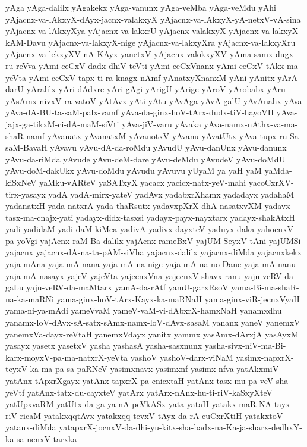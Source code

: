 {yAga
yAga-dalilx
yAgakekx
yAga-vanunx
yAga-veMba
yAga-veMdu
yAhi
yAjacnx-va-lAkxyX-dAyx-jacnx-valakxyX
yAjacnx-va-lAkxyX-yA-netxV-vA-sina
yAjacnx-va-lAkxyXya
yAjacnx-va-lakxrU
yAjacnx-valakxyX
yAjacnx-va-lakxyX-kAM-Davu
yAjacnx-va-lakxyX-nige
yAjacnx-va-lakxyXra
yAjacnx-va-lakxyXru
yAjacnx-va-lekxyXV-nA-KAyx-yanetxV
yAjacnx-valokxyXV
yAma-samx-dugx-ru-reVva
yAmi-ceCxV-dadx-dhiV-teVti
yAmi-ceCxVnanx
yAmi-ceCxV-tAkx-ma-yeVta
yAmi-ceCxV-tapx-ti-ra-knagx-nAmf
yAnatxyXnanxM
yAni
yAnitx
yArA-darU
yAralilx
yAri-dAdxre
yAri-gAgi
yArigU
yArige
yAroV
yArobabx
yAru
yAsAmx-nivxV-ra-vatoV
yAtAvx
yAti
yAtu
yAvAga
yAvA-galU
yAvAnahx
yAva
yAva-dA-BU-ta-saM-palx-vamf
yAva-da-ginx-hoV-tArx-dudx-tiV-hayoVH
yAva-jajx-ga-tikxM-ci-dA-maM-siVti
yAva-jiV-varu
yAvaka
yAva-namx-nAthx-va-ma-shaR-namf
yAvanatx
yAvanatxM
yAvanotxV
yAvanu
yAvatUtx
yAva-tupx-ru-Sa-saM-BavaH
yAvavu
yAvu-dA-da-roMdu
yAvudU
yAvu-danUnx
yAvu-danunx
yAvu-da-riMda
yAvude
yAvu-deM-dare
yAvu-deMdu
yAvudeV
yAvu-doMdU
yAvu-doM-dakUkx
yAvu-doMdu
yAvudu
yAvuvu
yUyaM
ya
yaH
yaM
yaMda-kiSxNeV
yaMku-vARteV
yaSATxyX
yacacx
yacicx-natx-yeV-mahi
yacoCxrXV-tirx-yasayx
yadA
yadA-mirx-yateV
yadAvx
yadabxrXhamx
yadadayx
yadahaM
yadanatxH
yada-natxrA
yada-thaRsutx
yadavxpXrX-dhA-nasatxvXM
yadavx-tasx-ma-cnajx-yati
yadayx-didx-tasxsi
yadayx-payx-nayxtarx
yadayx-shakAtxH
yadi
yadidaM
yadi-daM-kiMca
yadivA
yadivx-dayxteV
yaduyx-daka
yahocnxV-pa-yoVgi
yajAcnx-raM-Ba-dalilx
yajAcnx-rameBxV
yajUM-SeyxV-tAni
yajUMSi
yajacnx
yajacnx-dA-na-ta-pAM-siVha
yajacnx-dalilx
yajacnx-diMda
yajacnxkekx
yaja-mAna
yaja-mA-nana
yaja-mA-na-nige
yaja-mA-na-no-Dane
yaja-mA-nanu
yaja-mA-nasayx
yajeV
yajeVta
yajecnxVna
yajecnxV-shavx-ranu
yaju-veRV-da-gaLu
yaju-veRV-da-maMtarx
yamA-da-rAtf
yamU-garxRsoV
yama-Bi-ma-shaR-na-ka-maRNi
yama-ginx-hoV-tArx-Kayx-ka-maRNaH
yama-ginx-viR-jecnxVyaH
yama-ni-ya-mAdi
yameVvaM
yameV-vaM-vi-dAbxrX-hamxNaH
yanamxdhu
yanamx-loV-dAvx-sA-satx-sAmx-namx-loV-dAvx-sasaM
yananx
yaneV
yanemxV
yanemxVa-dayx-reVtaH
yanemxVdayx
yanitx
yanunx
yasAmx-dArxjA
yasAyxM
yasayx
yasetx
yasetxV
yasha
yashasA
yasha-sasxnunx
yasha-sivx-niV-ma-Bi-karx-moyxV-pa-ma-natxrX-yeVta
yashoV
yashoV-darx-viNaM
yasimx-napxrX-teyxV-ka-ma-pa-sa-paRNeV
yasimxnavx
yasimxnf
yasimx-nfva
yatAkxmiV
yatAnx-tApxrXgayx
yatAnx-tapxrX-pa-cnicxtaH
yatAnx-tasx-mu-pa-veV-sha-yeVtf
yatAnx-tatx-du-cayxteV
yatArx
yatArx-nAnx-hu-ti-riV-kaSxyXteV
yatUpxvaRM
yatUtx-da-ga-ya-nA-peVkASx
yata
yataH
yatakx-maR-NA-tayx-riV-ricaM
yatakxqqtAvx
yatakxqq-tevxV-tAyx-da-rA-cuCxrXtiH
yatakxtoV
yatanx-diMda
yatapxrX-jocnxV-da-dhi-yu-kitx-sha-badx-na-Ka-ja-sharx-dedhxY-ka-sa-nenxV-tarxka
}
